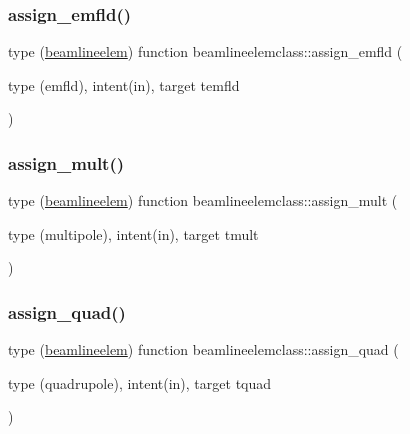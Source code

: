 \mbox{\label{namespacebeamlineelemclass_ac9cc1a9326b192530803d06d2e8b088b}} 
\subsubsection{\texorpdfstring{assign\_emfld()}{assign\_emfld()}}
{\footnotesize\ttfamily type (\mbox{\hyperlink{namespacebeamlineelemclass_structbeamlineelemclass_1_1beamlineelem}{beamlineelem}}) function beamlineelemclass\+::assign\+\_\+emfld (\begin{DoxyParamCaption}\item[{type (emfld), intent(in), target}]{temfld }\end{DoxyParamCaption})}

\mbox{\label{namespacebeamlineelemclass_aacf4de73999b66f3e37bf58cda6e562b}} 
\subsubsection{\texorpdfstring{assign\_mult()}{assign\_mult()}}
{\footnotesize\ttfamily type (\mbox{\hyperlink{namespacebeamlineelemclass_structbeamlineelemclass_1_1beamlineelem}{beamlineelem}}) function beamlineelemclass\+::assign\+\_\+mult (\begin{DoxyParamCaption}\item[{type (multipole), intent(in), target}]{tmult }\end{DoxyParamCaption})}

\mbox{\label{namespacebeamlineelemclass_aad515fd3f566490d835b1d406b23ea12}} 
\subsubsection{\texorpdfstring{assign\_quad()}{assign\_quad()}}
{\footnotesize\ttfamily type (\mbox{\hyperlink{namespacebeamlineelemclass_structbeamlineelemclass_1_1beamlineelem}{beamlineelem}}) function beamlineelemclass\+::assign\+\_\+quad (\begin{DoxyParamCaption}\item[{type (quadrupole), intent(in), target}]{tquad }\end{DoxyParamCaption})}


